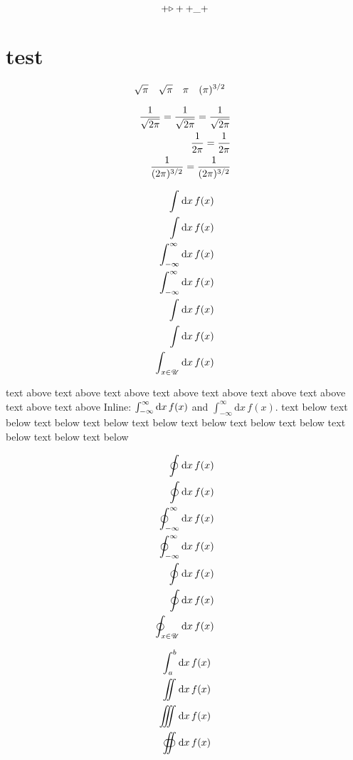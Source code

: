 \documentclass{article}
\begin{document}
%
\begin{equation}
+\vcenter{\hbox{$\triangleright$}}+
+\_+
\end{equation}
%

\section{test}

%
\begin{equation}
  \nsqrt{\pi}\quad
  \nsqrt[1]{\pi}\quad
  \nsqrt[2]{\pi}\quad
  \nsqrt[3]{\pi}\quad
\end{equation}
%

\newcommand{\isqpi}[1][1]{\frac{1}{\nsqrt[#1]{2\pi}}}

%
\begin{align*}
  \isqpi = \isqpi[1] = \frac{1}{\sqrt{2\pi}}\\
  \isqpi[2] = \frac{1}{2\pi}\\
  \isqpi[3] = \frac{1}{(2\pi)^{3/2}}
\end{align*}
%

\pagebreak

\begin{align*}
  \idd{x} f(x)\\
  \int \mathrm{d}x\, f(x)\\
  \idd[-\infty][\infty]{x} f(x)\\
  \int_{-\infty}^{\infty}\mathrm{d}x\, f(x)\\
  \idd{x} f(x)\\
  \int \mathrm{d}x\, f(x)\\
  \idd[x \in \mathscr{U}]{x} f(x)\\
\end{align*}

text above
text above
text above
text above
text above
text above
text above
text above
text above
Inline: $\idd[-\infty][\infty]{x} f(x)$ and $\int_{-\infty}^{\infty}\mathrm{d}x\, f(x)$.
text below
text below
text below
text below
text below
text below
text below
text below
text below
text below
text below

\begin{align*}
  \oidd{x} f(x)\\
  \oint \mathrm{d}x\, f(x)\\
  \oidd[-\infty][\infty]{x} f(x)\\
  \oint_{-\infty}^{\infty}\mathrm{d}x\, f(x)\\
  \oidd{x} f(x)\\
  \oint \mathrm{d}x\, f(x)\\
  \oidd[x \in \mathscr{U}]{x} f(x)\\
\end{align*}

\begin{align*}
  \idd[a][b]{x} f(x)\\
  \iidd{x} f(x)\\
  \iiidd{x} f(x)\\
  \oiidd{x} f(x)
\end{align*}
\end{document}
